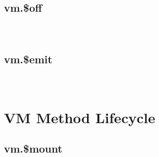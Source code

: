 \subsection{vm.\$off}








\begin{lstlisting}[language=JavaScript]

\end{lstlisting}




\begin{lstlisting}[language=JavaScript]

\end{lstlisting}




\begin{lstlisting}[language=JavaScript]

\end{lstlisting}




\subsection{vm.\$emit}








\begin{lstlisting}[language=JavaScript]

\end{lstlisting}




\begin{lstlisting}[language=JavaScript]

\end{lstlisting}




\begin{lstlisting}[language=JavaScript]

\end{lstlisting}




\section{VM Method Lifecycle}


\subsection{vm.\$mount}










